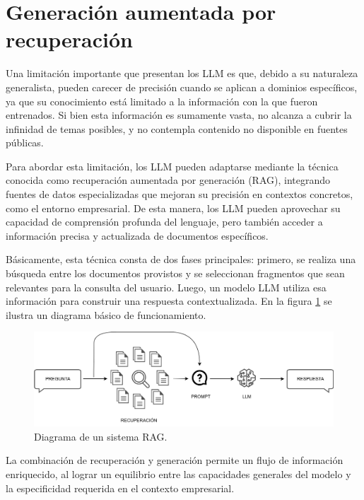 \section{Generación aumentada por recuperación}

Una limitación importante que presentan los LLM es que, debido a su naturaleza generalista, pueden 
carecer de precisión cuando se aplican a dominios específicos, ya que su conocimiento está limitado a la información 
con la que fueron entrenados. Si bien esta información es sumamente vasta, no alcanza a cubrir la infinidad de temas 
posibles, y no contempla contenido no disponible en fuentes públicas.

Para abordar esta limitación, los LLM pueden adaptarse mediante la técnica conocida como recuperación aumentada por 
generación (RAG), integrando fuentes de datos especializadas que mejoran su precisión 
en contextos concretos, como el entorno empresarial. De esta manera, los LLM pueden aprovechar su capacidad de 
comprensión profunda del lenguaje, pero también acceder a información precisa y actualizada de documentos específicos.

Básicamente, esta técnica consta de dos fases principales: primero, se realiza una búsqueda entre los documentos
provistos y se seleccionan fragmentos que sean relevantes para la consulta del usuario. Luego, un modelo LLM
utiliza esa información para construir una respuesta contextualizada. En la figura \ref{fig:rag} se ilustra
un diagrama básico de funcionamiento.

\vspace{3mm}

\begin{figure}[ht]
	\centering
	\includegraphics[scale=.24]{./Figures/rag.png}
	\caption{Diagrama de un sistema RAG.}
	\label{fig:rag}
\end{figure}

La combinación de recuperación y generación permite un flujo de información enriquecido, al lograr un equilibrio 
entre las capacidades generales del modelo y la especificidad requerida en el contexto empresarial.

